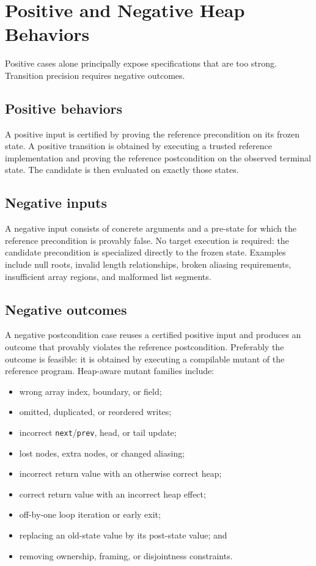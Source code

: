 \documentclass[10pt]{article}
\begin{document}
\section{Positive and Negative Heap Behaviors}
\label{sec:negative}

Positive cases alone principally expose specifications that are too strong.
Transition precision requires negative outcomes.

\subsection{Positive behaviors}

A positive input is certified by proving the reference precondition on its
frozen state.  A positive transition is obtained by executing a trusted
reference implementation and proving the reference postcondition on the
observed terminal state.  The candidate is then evaluated on exactly those
states.

\subsection{Negative inputs}

A negative input consists of concrete arguments and a pre-state for which the
reference precondition is provably false.  No target execution is required:
the candidate precondition is specialized directly to the frozen state.
Examples include null roots, invalid length relationships, broken aliasing
requirements, insufficient array regions, and malformed list segments.

\subsection{Negative outcomes}

A negative postcondition case reuses a certified positive input and produces
an outcome that provably violates the reference postcondition.  Preferably the
outcome is feasible: it is obtained by executing a compilable mutant of the
reference program.  Heap-aware mutant families include:

\begin{itemize}[leftmargin=1.4em]
  \item wrong array index, boundary, or field;
  \item omitted, duplicated, or reordered writes;
  \item incorrect \texttt{next}/\texttt{prev}, head, or tail update;
  \item lost nodes, extra nodes, or changed aliasing;
  \item incorrect return value with an otherwise correct heap;
  \item correct return value with an incorrect heap effect;
  \item off-by-one loop iteration or early exit;
  \item replacing an old-state value by its post-state value; and
  \item removing ownership, framing, or disjointness constraints.
\end{itemize}
\end{document}

